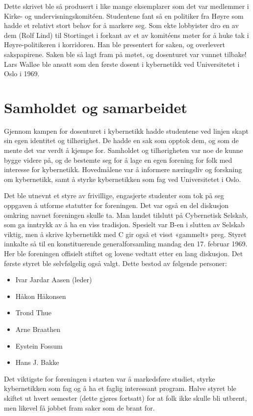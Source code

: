 Dette skrivet ble så produsert i like mange eksemplarer som det var medlemmer i Kirke- og undervisningskomitéen. Studentene fant så en politiker fra Høyre som hadde et relativt stort behov for å markere seg. Som ekte lobbyister dro en av dem (Rolf Lind) til Stortinget i forkant av et av komitéens møter for å huke tak i Høyre-politikeren i korridoren. Han ble presentert for saken, og overlevert sakspapirene. Saken ble så lagt fram på møtet, og dosenturet var vunnet tilbake!
Lars Walløe ble ansatt som den første dosent i kybernetikk ved Universitetet i Oslo i 1969.

\section{Samholdet og samarbeidet}

Gjennom kampen for dosenturet i kybernetikk hadde studentene ved linjen skapt sin egen identitet og tilhørighet. De hadde en sak som opptok dem, og som de mente det var verdt å kjempe for. Samholdet og tilhørigheten var noe de kunne bygge videre på, og de bestemte seg for å lage en egen forening for folk med interesse for kybernetikk. Hovedmålene var å informere næringsliv og forskning om kybernetikk, samt å styrke kybernetikken som fag ved Universitetet i Oslo.

Det ble utnevnt et styre av frivillige, engasjerte studenter som tok på seg oppgaven å utforme statutter for foreningen. Det var også en del diskusjon omkring navnet foreningen skulle ta. Man landet tilslutt på Cybernetisk Selskab, som ga inntrykk av å ha en viss tradisjon. Spesielt var B-en i slutten av Selskab viktig, men å skrive kybernetikk med C gir også et visst «gammelt» preg. Styret innkalte så til en konstituerende generalforsamling mandag den 17. februar 1969. Her ble foreningen offisielt stiftet og lovene vedtatt etter en lang diskusjon. Det første styret ble selvfølgelig også valgt. Dette bestod av følgende personer:

\begin{itemize}
\item Ivar Jardar Aasen (leder)
\item Håkon Håkonsen
\item Trond Thue
\item Arne Braathen
\item Eystein Fossum
\item Hans J. Bakke
\end{itemize}

Det viktigste for foreningen i starten var å markedsføre studiet, styrke kybernetikken som fag og å ha et faglig interessant program. Halve styret ble skiftet ut hvert semester (dette gjøres fortsatt) for at folk ikke skulle bli utbrent, men likevel få jobbet fram saker som de brant for.

